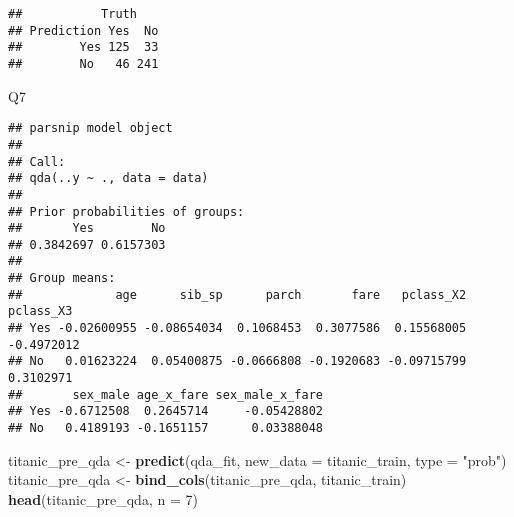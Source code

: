 \documentclass[]{article}
\newenvironment{Shaded}{\begin{snugshade}}{\end{snugshade}}
\newcommand{\DataTypeTok}[1]{\textcolor[rgb]{0.13,0.29,0.53}{#1}}
\newcommand{\DecValTok}[1]{\textcolor[rgb]{0.00,0.00,0.81}{#1}}
\newcommand{\KeywordTok}[1]{\textcolor[rgb]{0.13,0.29,0.53}{\textbf{#1}}}
\newcommand{\NormalTok}[1]{#1}
\newcommand{\OperatorTok}[1]{\textcolor[rgb]{0.81,0.36,0.00}{\textbf{#1}}}
\newcommand{\StringTok}[1]{\textcolor[rgb]{0.31,0.60,0.02}{#1}}
\begin{document}
\begin{verbatim}
##           Truth
## Prediction Yes  No
##        Yes 125  33
##        No   46 241
\end{verbatim}

Q7

\begin{Shaded}
\end{Shaded}

\begin{verbatim}
## parsnip model object
## 
## Call:
## qda(..y ~ ., data = data)
## 
## Prior probabilities of groups:
##       Yes        No 
## 0.3842697 0.6157303 
## 
## Group means:
##             age      sib_sp      parch       fare   pclass_X2  pclass_X3
## Yes -0.02600955 -0.08654034  0.1068453  0.3077586  0.15568005 -0.4972012
## No   0.01623224  0.05400875 -0.0666808 -0.1920683 -0.09715799  0.3102971
##       sex_male age_x_fare sex_male_x_fare
## Yes -0.6712508  0.2645714     -0.05428802
## No   0.4189193 -0.1651157      0.03388048
\end{verbatim}

\begin{Shaded}
\begin{Highlighting}[]
\NormalTok{titanic_pre_qda <-}\StringTok{ }\KeywordTok{predict}\NormalTok{(qda_fit, }\DataTypeTok{new_data =}\NormalTok{ titanic_train, }\DataTypeTok{type =} \StringTok{"prob"}\NormalTok{)}
\NormalTok{titanic_pre_qda <-}\StringTok{ }\KeywordTok{bind_cols}\NormalTok{(titanic_pre_qda, titanic_train)}
\KeywordTok{head}\NormalTok{(titanic_pre_qda, }\DataTypeTok{n =} \DecValTok{7}\NormalTok{)}
\end{Highlighting}
\end{Shaded}
\end{document}
